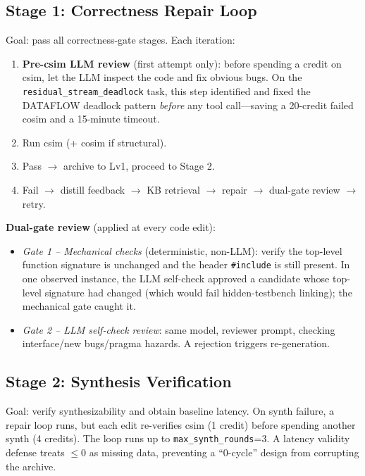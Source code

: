 \documentclass[10pt,conference,letterpaper]{IEEEtran}
\begin{document}
\subsection{Stage 1: Correctness Repair Loop}
\label{sec:correctness}

Goal: pass all correctness-gate stages. Each iteration:
\begin{enumerate}
    \item \textbf{Pre-csim LLM review} (first attempt only): before spending a credit on csim, let the LLM inspect the code and fix obvious bugs. On the \texttt{residual\_stream\_deadlock} task, this step identified and fixed the DATAFLOW deadlock pattern \emph{before} any tool call---saving a 20-credit failed cosim and a 15-minute timeout.
    \item Run csim (+ cosim if structural).
    \item Pass $\to$ archive to Lv1, proceed to Stage 2.
    \item Fail $\to$ distill feedback $\to$ KB retrieval $\to$ repair $\to$ dual-gate review $\to$ retry.
\end{enumerate}

\textbf{Dual-gate review} (applied at every code edit):
\begin{itemize}
    \item \emph{Gate 1 -- Mechanical checks} (deterministic, non-LLM): verify the top-level function signature is unchanged and the header \texttt{\#include} is still present. In one observed instance, the LLM self-check approved a candidate whose top-level signature had changed (which would fail hidden-testbench linking); the mechanical gate caught it.
    \item \emph{Gate 2 -- LLM self-check review}: same model, reviewer prompt, checking interface/new bugs/pragma hazards. A rejection triggers re-generation.
\end{itemize}

\subsection{Stage 2: Synthesis Verification}

Goal: verify synthesizability and obtain baseline latency. On synth failure, a repair loop runs, but each edit re-verifies csim (1 credit) before spending another synth (4 credits). The loop runs up to \texttt{max\_synth\_rounds}=3. A latency validity defense treats $\leq 0$ as missing data, preventing a ``0-cycle'' design from corrupting the archive.
\end{document}

